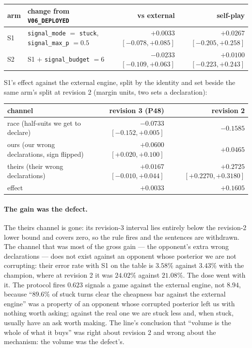 \documentclass[11pt,letterpaper]{article}
\begin{document}
\begin{center}
\small
\begin{tabular}{l>{\raggedright\arraybackslash}p{4.4cm}rr}
\toprule
arm & change from \texttt{V06\_DEPLOYED} & vs external & self-play \\
\midrule
S1 & \texttt{signal\_mode} $=$ \texttt{stuck}, \texttt{signal\_max\_p} $=0.5$ & $\mathbf{+0.0033}$ $[-0.078, +0.085]$ & $\mathbf{+0.0267}$ $[-0.205, +0.258]$ \\
S2 & S1 $+$ \texttt{signal\_budget} $=6$ & $\mathbf{-0.0233}$ $[-0.109, +0.063]$ & $+0.0100$ $[-0.223, +0.243]$ \\
\bottomrule
\end{tabular}
\end{center}

\noindent S1's effect against the external engine, split by the identity and set beside
the same arm's split at revision 2 (margin units, two sets a declaration):

\begin{center}
\small
\begin{tabular}{lrr}
\toprule
channel & revision 3 (P48) & revision 2 \\
\midrule
race (half-suits we get to declare) & $-0.0733$ $[-0.152, +0.005]$ & $-0.1585$ \\
ours (our wrong declarations, sign flipped) & $\mathbf{+0.0600}$ $[+0.020, +0.100]$ & $+0.0465$ \\
theirs (their wrong declarations) & $\mathbf{+0.0167}$ $[-0.010, +0.044]$ & $+0.2725$ $[+0.2270, +0.3180]$ \\
\midrule
effect & $+0.0033$ & $+0.1605$ \\
\bottomrule
\end{tabular}
\end{center}

\paragraph{The gain was the defect.} The theirs channel is gone: its
revision-3 interval lies entirely below the revision-2 lower bound and covers
zero, so the rule fires and the sentences are withdrawn. The channel that was
most of the gross gain --- the opponent's extra wrong declarations --- does not
exist against an opponent whose posterior we are not corrupting: their error
rate with S1 on the table is $3.58\%$ against $3.43\%$ with the champion, where
at revision 2 it was $24.02\%$ against $21.08\%$. The dose went with it. The
protocol fires $\mathbf{0.623}$ signals a game against the external engine, not $8.94$,
because ``$89.6\%$ of stuck turns clear the cheapness bar against
the external engine'' was a property of an opponent whose corrupted posterior
left us with nothing worth asking; against the real one we are stuck less and,
when stuck, usually have an ask worth making. The line's conclusion that
``volume is the whole of what it buys'' was right about revision 2 and wrong
about the mechanism: the volume was the defect's.
\end{document}
